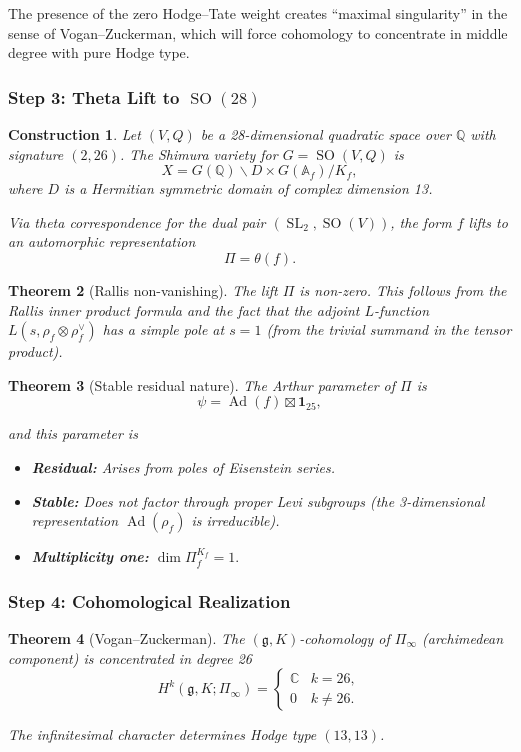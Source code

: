 \documentclass[12pt]{amsart}
\newtheorem{theorem}{Theorem}[section]
\newtheorem{construction}[theorem]{Construction}
\theoremstyle{definition}
\DeclareMathOperator\SO{SO}
\DeclareMathOperator\SL{SL}
\DeclareMathOperator\Ad{Ad}
\newcommand{\A}{\mathbb{A}}
\newcommand{\Q}{\mathbb{Q}}
\newcommand{\C}{\mathbb{C}}
\begin{document}
The presence of the zero Hodge--Tate weight creates ``maximal singularity'' in the sense of Vogan--Zuckerman, which will force cohomology to concentrate in middle degree with pure Hodge type.

\subsubsection{Step 3: Theta Lift to $\SO(28)$}

\begin{construction}
Let $(V, Q)$ be a 28-dimensional quadratic space over $\Q$ with signature $(2,26)$. The Shimura variety for $G = \SO(V,Q)$ is
$$X = G(\Q) \backslash D \times G(\A_f) / K_f,$$
where ${D}$ is a Hermitian symmetric domain of complex dimension 13.

Via theta correspondence for the dual pair $(\SL_2, \SO(V))$, the form $f$ lifts to an automorphic representation
$$\Pi = \theta(f).$$
\end{construction}

\begin{theorem}[Rallis non-vanishing]
The lift $\Pi$ is non-zero. This follows from the Rallis inner product formula and the fact that the adjoint $L$-function $L(s, \rho_f \otimes \rho_f^\vee)$ has a simple pole at $s=1$ (from the trivial summand in the tensor product).
\end{theorem}

\begin{theorem}[Stable residual nature]
The Arthur parameter of $\Pi$ is
$$\psi = \Ad(f) \boxtimes \mathbf{1}_{25},$$ \pagebreak

and this parameter is
\begin{itemize}
\item \textbf{Residual:} Arises from poles of Eisenstein series.
\item \textbf{Stable:} Does not factor through proper Levi subgroups (the 3-dimensional representation $\Ad(\rho_f)$ is irreducible).
\item \textbf{Multiplicity one:} $\dim \Pi_f^{K_f} = 1.$
\end{itemize}
\end{theorem}

\subsubsection{Step 4: Cohomological Realization}

\begin{theorem}[Vogan--Zuckerman]
The $(\mathfrak{g},K)$-cohomology of $\Pi_\infty$ (archimedean component) is concentrated in degree 26
$$H^k(\mathfrak{g}, K; \Pi_\infty) = \begin{cases} \C & k = 26, \\ 0 & k \neq 26. \end{cases}$$

The infinitesimal character determines Hodge type $(13,13)$.
\end{theorem}
\end{document}

